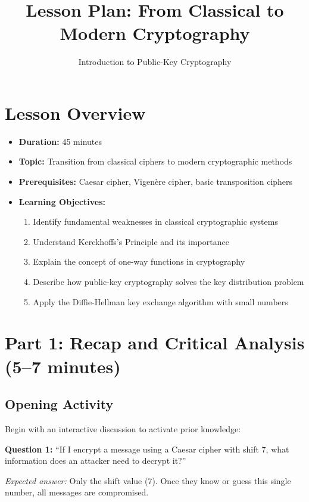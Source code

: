 \documentclass[11pt]{article}
\title{\textbf{Lesson Plan: From Classical to Modern Cryptography}}
\author{Introduction to Public-Key Cryptography}
\date{}
\begin{document}
\maketitle

\section*{Lesson Overview}
\begin{itemize}
    \item \textbf{Duration:} 45 minutes
    \item \textbf{Topic:} Transition from classical ciphers to modern cryptographic methods
    \item \textbf{Prerequisites:} Caesar cipher, Vigenère cipher, basic transposition ciphers
    \item \textbf{Learning Objectives:}
    \begin{enumerate}
        \item Identify fundamental weaknesses in classical cryptographic systems
        \item Understand Kerckhoffs's Principle and its importance
        \item Explain the concept of one-way functions in cryptography
        \item Describe how public-key cryptography solves the key distribution problem
        \item Apply the Diffie-Hellman key exchange algorithm with small numbers
    \end{enumerate}
\end{itemize}

\section{Part 1: Recap and Critical Analysis (5--7 minutes)}

\subsection*{Opening Activity}
Begin with an interactive discussion to activate prior knowledge:

\textbf{Question 1:} ``If I encrypt a message using a Caesar cipher with shift 7, what information does an attacker need to decrypt it?''

\textit{Expected answer:} Only the shift value (7). Once they know or guess this single number, all messages are compromised.

\vspace{0.3cm}
\end{document}
